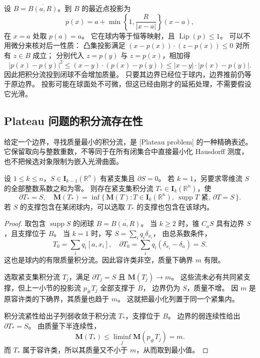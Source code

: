 设 \(B=\overline{B(a,R)}\)。到 \(B\) 的最近点投影为
\[
 p(x)=a+\min\!\left\{1,\frac{R}{|x-a|}\right\}(x-a),
\]
在 \(x=a\) 处取 \(p(a)=a\)。
它在球内等于恒等映射，且 \(\operatorname{Lip}(p)\leq1\)。
可以不用微分来核对后一性质：
凸集投影满足 \((x-p(x))\cdot(z-p(x))\leq0\) 对所有 \(z\in B\) 成立；
分别代入 \(z=p(y)\) 与 \(z=p(x)\)，相加得
\[
 |p(x)-p(y)|^2\leq (x-y)\cdot(p(x)-p(y))
                \leq |x-y|\cdot|p(x)-p(y)|.
\]
因此把积分流投到闭球不会增加质量。
只要其边界已经位于球内，边界推前仍等于原边界。
投影可能在球面处不可微，但这已经由刚才的延拓处理，不需要假设它光滑。

\subsection{Plateau 问题的积分流存在性}
\label{b1:subsec:D10603}

给定一个边界，寻找质量最小的积分流，是%
[Plateau problem]%
的一种精确表述。
它保留取向与整数重数，不等同于在所有闭集合中直接最小化 Hausdorff 测度，
也不把候选对象限制为嵌入光滑曲面。

\begin{theorem}\label{b1:thm:app-d-plateau-existence}
设 \(1\leq k\leq n\)，\(S\in\mathbf I_{k-1}(\mathbb R^n)\) 有紧支集且
\(\partial S=0\)。
若 \(k=1\)，另要求零维流 \(S\) 的全部整数系数之和为零。
则存在紧支集积分流 \(T_*\in\mathbf I_k(\mathbb R^n)\)，使
\[
 \partial T_*=S,\quad
 \mathbf M(T_*)=
   \inf\{\,\mathbf M(T):T\in\mathbf I_k(\mathbb R^n),\
                      \operatorname{supp}T\text{ 紧},\ \partial T=S\,\}.
\]
若 \(S\) 的支撑包含在某闭球内，可以选取 \(T_*\) 的支撑也包含在该球内。
\end{theorem}
\begin{proof}
取包含 \(\operatorname{supp}S\) 的闭球 \(B=\overline{B(a,R)}\)。
当 \(k\geq2\) 时，锥 \(C_aS\) 具有边界 \(S\)，且支撑位于 \(B\)。
当 \(k=1\) 时，写 \(S=\sum_iq_i\delta_{x_i}\)，
由总系数条件，
\[
 T_0=\sum_iq_i[a,x_i],\quad
 \partial T_0=\sum_iq_i(\delta_{x_i}-\delta_a)=S.
\]
这也是球内的有限质量积分流。因此容许类非空，质量下确界 \(m\) 有限。

选取紧支集积分流 \(T_j\)，满足 \(\partial T_j=S\) 且
\(\mathbf M(T_j)\rightarrow m\)。
这些流未必有共同紧支撑，但上一小节的投影流 \(p_\#T_j\) 全部支撑于 \(B\)，
边界仍为 \(S\)，质量不增。
因 \(m\) 是原容许类的下确界，其质量也趋于 \(m\)。
这就把最小化列置于同一个紧集内。

积分流紧性给出子列弱收敛于积分流 \(T_*\)，支撑位于 \(B\)。
边界的弱连续性给出 \(\partial T_*=S\)。
由质量下半连续性，
\[
 \mathbf M(T_*)\leq\liminf_j\mathbf M(p_\#T_j)=m.
\]
而 \(T_*\) 属于容许类，所以其质量又不小于 \(m\)，从而取到最小值。
\end{proof}

